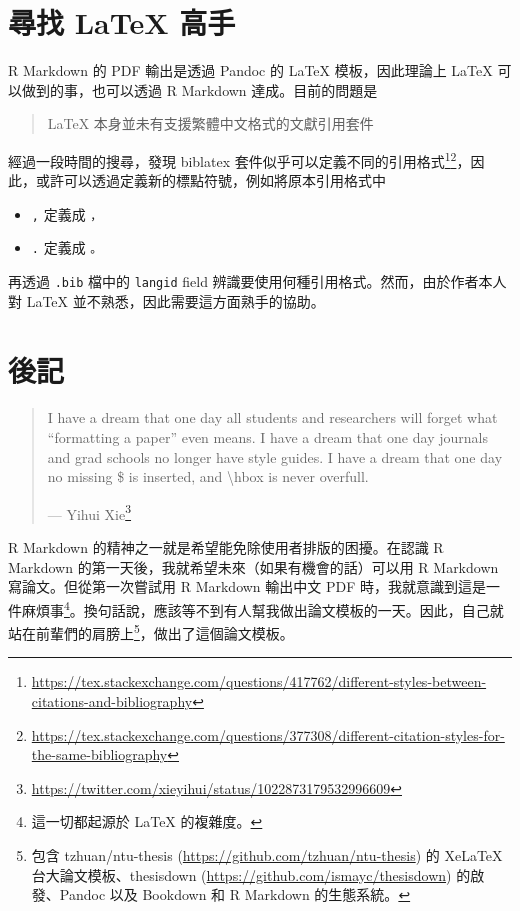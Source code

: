\documentclass[oneside]{book}
\renewcommand{\href}[2]{#2\footnote{\url{#1}}}
\providecommand{\tightlist}{%
  \setlength{\itemsep}{0pt}\setlength{\parskip}{0pt}}
\renewcommand{\appendixname}{附錄}
\theoremstyle{definition}
\theoremstyle{definition}
\theoremstyle{definition}
\theoremstyle{remark}
\begin{document}
\hypertarget{appendix-}{%
\appendix \addcontentsline{toc}{chapter}{\appendixname}}


\hypertarget{latex-cite-pkg}{%
\chapter{尋找 LaTeX 高手}\label{latex-cite-pkg}}

R Markdown 的 PDF 輸出是透過 Pandoc 的 LaTeX 模板，因此理論上 LaTeX 可以做到的事，也可以透過 R Markdown 達成。目前的問題是

\begin{quote}
LaTeX 本身並未有支援繁體中文格式的文獻引用套件
\end{quote}

經過一段時間的搜尋，發現 biblatex 套件似乎可以定義不同的引用格式\footnote{\url{https://tex.stackexchange.com/questions/417762/different-styles-between-citations-and-bibliography}}\footnote{\url{https://tex.stackexchange.com/questions/377308/different-citation-styles-for-the-same-bibliography}}，因此，或許可以透過定義新的標點符號，例如將原本引用格式中

\begin{itemize}
\tightlist
\item
  \texttt{,} 定義成 \texttt{，}
\item
  \texttt{.} 定義成 \texttt{。}
\end{itemize}

再透過 \texttt{.bib} 檔中的 \texttt{langid} field 辨識要使用何種引用格式。然而，由於作者本人對 LaTeX 並不熟悉，因此需要這方面熟手的協助。

\hypertarget{epilogue}{%
\chapter{後記}\label{epilogue}}

\begin{quote}
I have a dream that one day all students and researchers will forget what ``formatting a paper'' even means. I have a dream that one day journals and grad schools no longer have style guides. I have a dream that one day no missing \$ is inserted, and \textbackslash{}hbox is never overfull.

\hspace*{\fill}

--- \href{https://twitter.com/xieyihui/status/1022873179532996609}{Yihui Xie}
\end{quote}

R Markdown 的精神之一就是希望能免除使用者排版的困擾。在認識 R Markdown 的第一天後，我就希望未來（如果有機會的話）可以用 R Markdown 寫論文。但從第一次嘗試用 R Markdown 輸出中文 PDF 時，我就意識到這是一件麻煩事\footnote{這一切都起源於 LaTeX 的複雜度。}。換句話說，應該等不到有人幫我做出論文模板的一天。因此，自己就站在前輩們的肩膀上\footnote{包含 tzhuan/ntu-thesis (\url{https://github.com/tzhuan/ntu-thesis}) 的 XeLaTeX 台大論文模板、thesisdown (\url{https://github.com/ismayc/thesisdown}) 的啟發、Pandoc 以及 Bookdown 和 R Markdown 的生態系統。}，做出了這個論文模板。
\end{document}
